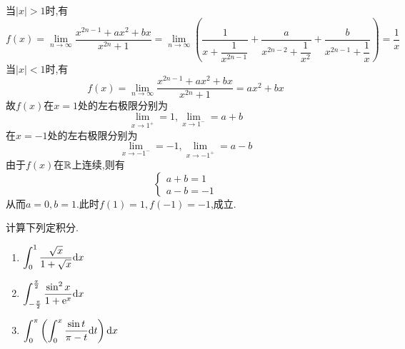 \documentclass{ctexart}
\begin{document}
\begin{solution}[Solution.]
    当$\left|x\right|>1$时,有$$f(x)=\lim_{n\to\infty}{\dfrac{x^{2n-1}+ax^2+bx}{x^{2n}+1}}=\lim_{n\to\infty}\left(\dfrac{1}{x+\dfrac{1}{x^{2n-1}}}+\dfrac{a}{x^{2n-2}+\dfrac{1}{x^2}}+\dfrac{b}{x^{2n-1}+\dfrac{1}{x}}\right)=\dfrac{1}{x}$$
    当$\left|x\right|<1$时,有$$f(x)=\lim_{n\to\infty}{\dfrac{x^{2n-1}+ax^2+bx}{x^{2n}+1}}=ax^2+bx$$
    故$f(x)$在$x=1$处的左右极限分别为$$\lim_{x\to1^+}=1,\lim_{x\to1^-}=a+b$$
    在$x=-1$处的左右极限分别为$$\lim_{x\to-1^-}=-1,\lim_{x\to-1^+}=a-b$$
    由于$f(x)$在$\mathbb{R}$上连续,则有
    $$\left\{\begin{array}{l}
        a+b=1 \\
        a-b=-1
    \end{array}
    \right.$$
    从而$a=0,b=1$.此时$f(1)=1,f(-1)=-1$,成立.
\end{solution}
\begin{problem}[5.(15\songti{分})]
    计算下列定积分.
    \begin{enumerate}[label=\textbf{(\arabic*)}]
        \item $\displaystyle\int_0^1\dfrac{\sqrt{x}}{1+\sqrt{x}}\mathrm{d} x$
        \item $\displaystyle\int_{-\frac{\pi}{2}}^{\frac{\pi}{2}}\dfrac{\sin^2x}{1+\mathrm{e}^x}\mathrm{d} x$
        \item $\displaystyle\int_{0}^{\pi}\left(\int_{0}^{x}\dfrac{\sin t}{\pi-t}\mathrm{d} t\right)\mathrm{d} x$
    \end{enumerate}
\end{problem}
\end{document}
